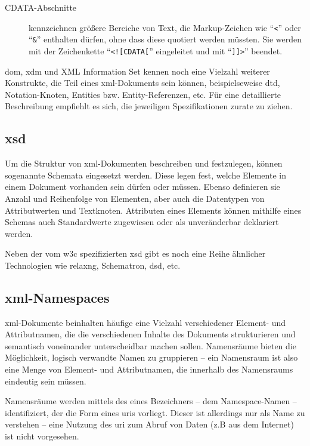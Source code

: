 \begin{description}
    \item[CDATA-Abschnitte] kennzeichnen größere Bereiche von Text, die Markup-Zeichen wie \enquote{\texttt{<}} oder \enquote{\texttt{\&}} enthalten dürfen, ohne dass diese quotiert werden müssten. Sie werden mit der Zeichenkette \enquote{\texttt{<![CDATA[}} eingeleitet und mit \enquote{\texttt{]]>}} beendet.\cite[Abschnitt 2.7]{maler2008xml}
\end{description}

\gls{dom}, \acrshort{xdm} und XML Information Set kennen noch eine Vielzahl weiterer Konstrukte, die Teil eines \acrshort{xml}-Dokuments sein können, beispielseweise \acrfull{dtd}, Notation-Knoten, Entities bzw. Entity-Referenzen, etc. Für eine detaillierte Beschreibung empfiehlt es sich, die jeweiligen Spezifikationen zurate zu ziehen.\cite{dom,xmlinfoset,xdm,xml}

\subsection{\acrfull{xsd}}

Um die Struktur von \acrshort{xml}-Dokumenten beschreiben und festzulegen, können sogenannte Schemata eingesetzt werden. Diese legen fest, welche Elemente in einem Dokument vorhanden sein dürfen oder müssen. Ebenso definieren sie Anzahl und Reihenfolge von Elementen, aber auch die Datentypen von Attributwerten und Textknoten. Attributen eines Elements können mithilfe eines Schemas auch Standardwerte zugewiesen oder als unveränderbar deklariert werden.

Neben der vom \gls{w3c} spezifizierten \acrfull{xsd} gibt es noch eine Reihe ähnlicher Technologien wie \acrshort{relaxng}, Schematron, \gls{dsd}, etc.

\subsection{\acrshort{xml}-Namespaces}
\label{sec:xmlns}

\acrshort{xml}-Dokumente beinhalten häufige eine Vielzahl verschiedener Element- und Attributnamen, die die verschiedenen Inhalte des Dokuments strukturieren und semantisch voneinander unterscheidbar machen sollen. Namensräume bieten die Möglichkeit, logisch verwandte Namen zu gruppieren -- ein Namensraum ist also eine Menge von Element- und Attributnamen, die innerhalb des Namensraums eindeutig sein müssen.

Namensräume werden mittels des eines Bezeichners -- dem Namespace-Namen -- identifiziert, der die Form eines \glspl{uri} vorliegt. Dieser ist allerdings nur als Name zu verstehen -- eine Nutzung des \gls{uri} zum Abruf von Daten (z.B aus dem Internet) ist nicht vorgesehen.

